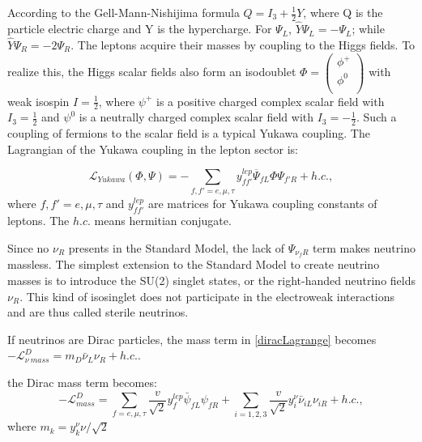 According to the Gell-Mann-Nishijima formula $Q=I_3+\frac{1}{2}Y$, where Q is the particle electric charge and Y is the hypercharge. For $\Psi_L$, $\hat Y\Psi_L = -\Psi_L$; while $\hat Y\Psi_R=-2\Psi_R$. The leptons acquire their masses by coupling to the Higgs fields. To realize this, the Higgs scalar fields also form an isodoublet $\Phi = \begin{pmatrix}\phi^+\\ \phi^0\\ \end{pmatrix}$ with weak isospin $I=\frac{1}{2}$, where $\psi^+$ is a positive charged complex scalar field with $I_3=\frac{1}{2}$ and $\psi^0$ is a neutrally charged complex scalar field with $I_3=-\frac{1}{2}$. Such a coupling of fermions to the scalar field is a typical Yukawa coupling. The Lagrangian of the Yukawa coupling in the lepton sector is\cite{funchal2013physics}:

\begin{equation}\label{yukawa}
\mathcal L_{Yukawa}(\Phi,\Psi) = -\sum_{f,f'=e,\mu,\tau} y^{lep}_{ff'} \overline{\Psi}_{fL}\Phi\Psi_{f'R} + h.c.,
\end{equation}
where $f,f'=e,\mu,\tau$ and $y^{lep}_{ff'}$ are matrices for Yukawa coupling constants of leptons. The $h.c.$ means hermitian conjugate.

Since no $\nu_R$ presents in the Standard Model, the lack of $\Psi_{\nu_f R}$ term makes neutrino massless. The simplest extension to the Standard Model to create neutrino masses is to introduce the SU(2) singlet states, or the right-handed neutrino fields $\nu_R$. This kind of isosinglet does not participate in the electroweak interactions and are thus called sterile neutrinos. 

If neutrinos are Dirac particles, the mass term in \ref{diracLagrange} becomes $-\mathcal L_{\nu~mass}^D = m_D\bar\nu_L\nu_R+h.c.$. 

the Dirac mass term becomes:
\begin{equation}
-\mathcal L^D_{mass} =\sum_{f=e,\mu,\tau}\frac{v}{\sqrt{2}}y_f^{lep}\bar{\psi}_{fL}\psi_{fR}+\sum_{i=1,2,3}\frac{v}{\sqrt{2}}y_{i}^\nu\bar\nu_{iL}\nu_{iR}+h.c.,
\end{equation}
where $m_k=y_k^\nu \nu/\sqrt 2$   










